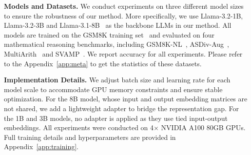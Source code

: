 \documentclass{article}
\theoremstyle{plain}
\theoremstyle{definition}
\theoremstyle{remark}
\begin{document}
\textbf{Models and Datasets.} We conduct experiments on three different model sizes to ensure the robustness of our method. More specifically, we use Llama-3.2-1B, Llama-3.2-3B and Llama-3.1-8B~\citep{grattafiori2024llama} as the backbone LLMs in our method. All models are trained on the GSM8K training set~\citep{cobbe2021training} and evaluated on four mathematical reasoning benchmarks, including GSM8K-NL~\citep{cobbe2021training}, ASDiv-Aug~\citep{xu2025softcot}, MultiArith~\citep{roy2015solving} and SVAMP~\citep{patel2021nlp}. We report accuracy for all experiments. Please refer to the Appendix~\ref{app:meta} to get the statistics of these datasets.


\textbf{Implementation Details.} 
We adjust batch size and learning rate for each model scale to accommodate GPU memory constraints and ensure stable optimization. For the 8B model, whose input and output embedding matrices are not shared, we add a lightweight adapter to bridge the representation gap. For the 1B and 3B models, no adapter is applied as they use tied input-output embeddings. All experiments were conducted on 4$\times$ NVIDIA A100 80GB GPUs. 
Full training details and hyperparameters are provided in Appendix~\ref{app:training}.
\end{document}
